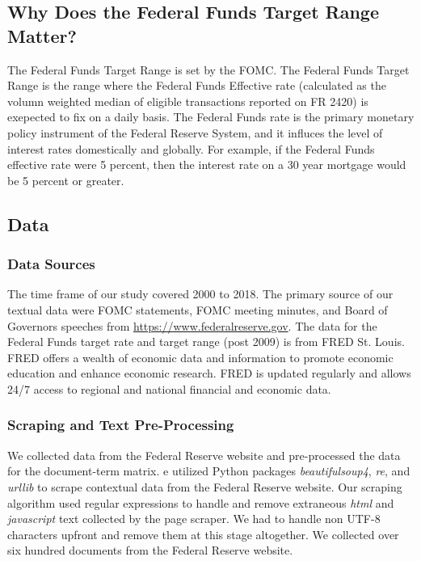 \documentclass[11pt]{article}
\newcommand{\vertSpace}[1]{\vspace{3mm}}
\begin{document}
{\subsection{Why Does the Federal Funds Target Range Matter?}

The Federal Funds Target Range is set by the FOMC.  The Federal Funds Target Range is the range where the Federal Funds Effective rate (calculated as the volumn weighted median of eligible transactions reported on FR 2420) is exepected to fix on a daily basis.  The Federal Funds rate is the primary monetary policy instrument of the Federal Reserve System, and it influces the level of interest rates domestically and globally.  For example, if the Federal Funds effective rate were 5 percent, then the interest rate on a 30 year mortgage would be 5 percent or greater.  

\subsection{Data}

\subsubsection{Data Sources}
The time frame of our study covered 2000 to 2018.  
The primary source of our textual data were FOMC statements, FOMC meeting minutes, and Board of Governors speeches from \url{https://www.federalreserve.gov}.  
The data for the Federal Funds target rate and target range (post 2009) is from FRED St. Louis.  
FRED offers a wealth of economic data and information to promote economic education and enhance economic research. 
FRED is updated regularly and allows 24/7 access to regional and national financial and economic data.


\subsubsection{Scraping and Text Pre-Processing}

We collected data from the Federal Reserve website and pre-processed the data for the document-term matrix. \vertSpace


We utilized Python packages \textit{beautifulsoup4}, \textit{re}, and \textit{urllib} to scrape contextual data from the Federal Reserve website.  Our scraping algorithm used regular expressions to handle and remove extraneous \textit{html} and \textit{javascript} text collected by the page scraper.  We had to handle non UTF-8 characters upfront and remove them at this stage altogether.  We collected over six hundred documents from the Federal Reserve website. \vertSpace


}
\end{document}
